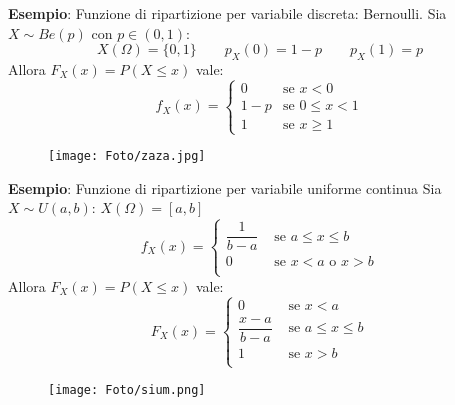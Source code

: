 \begin{tcolorbox}
    \textbf{Esempio}: Funzione di ripartizione per variabile discreta: Bernoulli. \newline Sia $X \sim Be(p) \text{ con } p \in (0,1)$: $$X(\Omega) = \{0,1\} \qquad p_X(0) = 1 - p \qquad p_X(1) = p$$ Allora $F_X (x) = P(X \leq x)$ vale:
    \begin{equation}
        f_X(x) =
        \begin{cases}
            0 & \text{se } x < 0\\
            1 - p & \text{se } 0 \leq x < 1 \\
            1 & \text{se } x \geq 1
        \end{cases}       
    \end{equation}
    \end{tcolorbox}
    \begin{figure}[h!]
        \centering
        \texttt{[image: Foto/zaza.jpg]} 
    \end{figure}


\begin{tcolorbox}
    \textbf{Esempio}: Funzione di ripartizione per variabile uniforme continua \newline Sia $X \sim U(a,b)$: $X(\Omega) = [a,b]$
    \begin{equation}
        f_X(x) = 
        \begin{cases}
            \dfrac{1}{b - a} & \text{ se } a \leq x \leq b \\
            0 & \text{ se } x < a \text{ o } x > b \\
        \end{cases}
    \end{equation}
    Allora $F_X(x) = P(X \leq x)$ vale:
    \begin{equation}
        F_X(x) =
        \begin{cases}
            0 & \text{ se } x < a \\
            \dfrac{x - a}{b - a} & \text{ se } a \leq x \leq b \\
            1  & \text{ se } x > b \\
        \end{cases}
    \end{equation}
\end{tcolorbox}
\begin{figure}[h!]
    \centering
    \texttt{[image: Foto/sium.png]} 
\end{figure}

